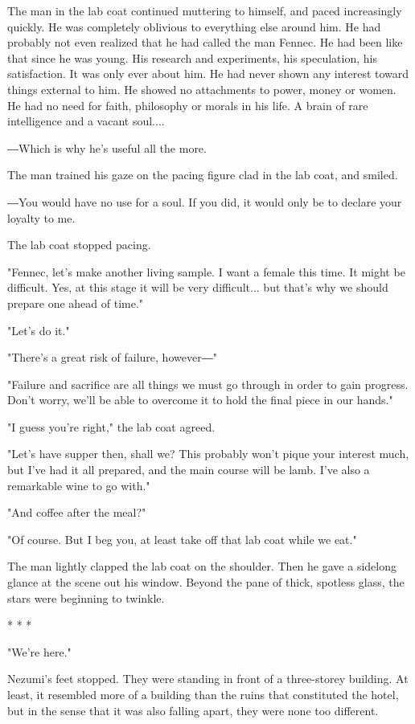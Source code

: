 The man in the lab coat continued muttering to himself, and paced
increasingly quickly. He was completely oblivious to everything else
around him. He had probably not even realized that he had called the man
Fennec. He had been like that since he was young. His research and
experiments, his speculation, his satisfaction. It was only ever about
him. He had never shown any interest toward things external to him. He
showed no attachments to power, money or women. He had no need for
faith, philosophy or morals in his life. A brain of rare intelligence
and a vacant soul....

―Which is why he's useful all the more.

The man trained his gaze on the pacing figure clad in the lab coat, and
smiled.

―You would have no use for a soul. If you did, it would only be to
declare your loyalty to me.

The lab coat stopped pacing.

"Fennec, let's make another living sample. I want a female this time. It
might be difficult. Yes, at this stage it will be very difficult... but
that's why we should prepare one ahead of time."

"Let's do it."

"There's a great risk of failure, however―"

"Failure and sacrifice are all things we must go through in order to
gain progress. Don't worry, we'll be able to overcome it to hold the
final piece in our hands."

"I guess you're right," the lab coat agreed.

"Let's have supper then, shall we? This probably won't pique your
interest much, but I've had it all prepared, and the main course will be
lamb. I've also a remarkable wine to go with."

"And coffee after the meal?"

"Of course. But I beg you, at least take off that lab coat while we
eat."

The man lightly clapped the lab coat on the shoulder. Then he gave a
sidelong glance at the scene out his window. Beyond the pane of thick,
spotless glass, the stars were beginning to twinkle.

* * *

"We're here."

Nezumi's feet stopped. They were standing in front of a three-storey
building. At least, it resembled more of a building than the ruins that
constituted the hotel, but in the sense that it was also falling apart,
they were none too different.


